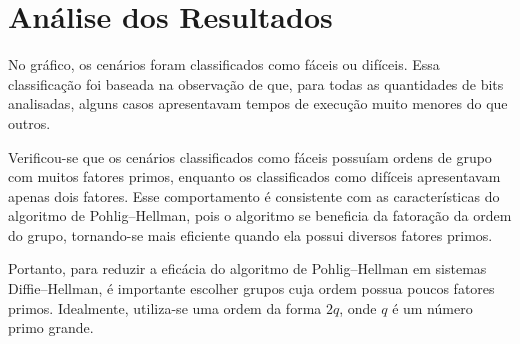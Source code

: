 \documentclass{article}
\begin{document}
\section{Análise dos Resultados}
No gráfico, os cenários foram classificados como fáceis ou difíceis.
Essa classificação foi baseada na observação de que, para todas as quantidades de bits analisadas,
alguns casos apresentavam tempos de execução muito menores do que outros.

Verificou-se que os cenários classificados como fáceis possuíam ordens de grupo com muitos fatores primos,
enquanto os classificados como difíceis apresentavam apenas dois fatores.
Esse comportamento é consistente com as características do algoritmo de Pohlig–Hellman,
pois o algoritmo se beneficia da fatoração da ordem do grupo,
tornando-se mais eficiente quando ela possui diversos fatores primos.

Portanto, para reduzir a eficácia do algoritmo de Pohlig–Hellman em sistemas Diffie–Hellman,
é importante escolher grupos cuja ordem possua poucos fatores primos.
Idealmente, utiliza-se uma ordem da forma $2q$, onde $q$ é um número primo grande.

\nocite{hac}


\end{document}
